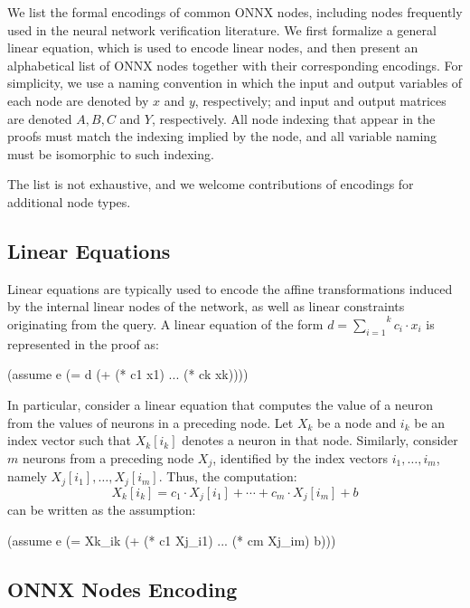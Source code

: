 We list the formal encodings of common ONNX nodes, including nodes frequently used in the neural network verification literature. We first formalize a general linear equation, which is used to encode linear nodes, and then present an alphabetical list of ONNX nodes together with their corresponding encodings.
For simplicity, we use a naming convention in which the input and output variables of each node are denoted by $x$ and $y$, respectively; and input and output matrices are denoted $A,B,C$ and $Y$, respectively. All node indexing that appear in the proofs must match the indexing implied by the node, and all variable naming must be isomorphic to such indexing.  

The list is not exhaustive, and we welcome contributions of encodings for additional node types.
 
\subsection{Linear Equations}

Linear equations are typically used to encode the affine transformations induced by the internal linear nodes of the network, as well as linear constraints originating from the query.
A linear equation of the form $d = \overset{k}{\underset{i=1}{\sum}} c_i \cdot x_i$  is represented in the proof
as: 

\begin{code}[style=lbnf]
(assume e (= d (+ (* c1 x1) ... (* ck xk))))
\end{code}

In particular, consider a linear equation that computes the value of a neuron from the values of neurons in a preceding node. Let $X_k$ be a node and $i_k$ be an index vector such that $X_k[i_k]$ denotes a neuron in that node. Similarly, consider $m$ neurons from a preceding node $X_j$, identified by the index vectors $i_1,\dots,i_m$, namely
$X_j[i_1],\dots,X_j[i_m]$.
Thus, the computation: 
\[X_k[i_k] = c_1 \cdot X_j[i_1] + \cdots + c_m \cdot X_j[i_m] + b\] can be written as the assumption:

\begin{code}[style=lbnf]
(assume e (= Xk_ik (+ (* c1 Xj_i1) ... (* cm Xj_im) b)))
\end{code}


\subsection{ONNX Nodes Encoding}
\label{sec:proof-node-encoding}

